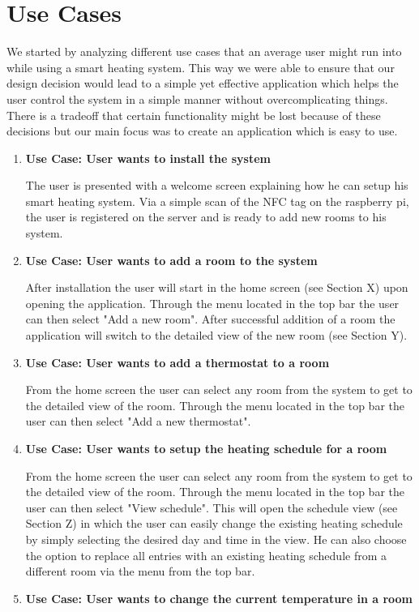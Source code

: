 \section{Use Cases}

We started by analyzing different use cases that an average user might run into while using a smart heating system. This way we were able to ensure that our design decision would lead to a simple yet effective application which helps the user control the system in a simple manner without overcomplicating things. There is a tradeoff that certain functionality might be lost because of these decisions but our main focus was to create an application which is easy to use. 

\begin{enumerate}
\item \textbf{Use Case: User wants to install the system}

The user is presented with a welcome screen explaining how he can setup his smart heating system. Via a simple scan of the NFC tag on the raspberry pi, the user is registered on the server and is ready to add new rooms to his system.
\item \textbf{Use Case: User wants to add a room to the system}

After installation the user will start in the home screen (see Section X) upon opening the application. Through the menu located in the top bar the user can then select "Add a new room". After successful addition of a room the application will switch to the detailed view of the new room (see Section Y).
\item \textbf{Use Case: User wants to add a thermostat to a room}

From the home screen the user can select any room from the system to get to the detailed view of the room. Through the menu located in the top bar the user can then select "Add a new thermostat".
\item \textbf{Use Case: User wants to setup the heating schedule for a room}

From the home screen the user can select any room from the system to get to the detailed view of the room. Through the menu located in the top bar the user can then select "View schedule". This will open the schedule view (see Section Z) in which the user can easily change the existing heating schedule by simply selecting the desired day and time in the view. He can also choose the option to replace all entries with an existing heating schedule from a different room via the menu from the top bar.
\item \textbf{Use Case: User wants to change the current temperature in a room}


\end{enumerate}
